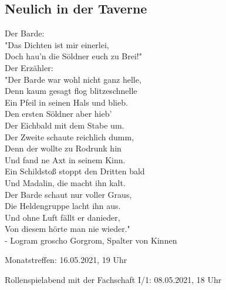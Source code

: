 \documentclass[final]{multiversum}
\begin{document}
\subsection{Neulich in der Taverne}
Der Barde:\\
"Das Dichten ist mir einerlei,\\
Doch hau'n die Söldner euch zu Brei!"\\[1em]
Der Erzähler:\\ 
"Der Barde war wohl nicht ganz helle,\\
Denn kaum gesagt flog blitzeschnelle\\
Ein Pfeil in seinen Hals und blieb.\\
Den ersten Söldner aber hieb'\\
Der Eichbald mit dem Stabe um. \\
Der Zweite schaute reichlich dumm,\\
Denn der wollte zu Rodrunk hin \\
Und fand ne Axt in seinem Kinn.\\
Ein Schildstoß stoppt den Dritten bald\\
Und Madalin, die macht ihn kalt.\\
Der Barde schaut nur voller Graus, \\
Die Heldengruppe lacht ihn aus.\\
Und ohne Luft fällt er danieder,\\
Von diesem hörte man nie wieder."\\[1em]
- Logram groscho Gorgrom, Spalter von Kinnen



\begin{termine}
\item Monatstreffen: 16.05.2021, 19 Uhr
\item Rollenspielabend mit der Fachschaft I/1: 08.05.2021, 18 Uhr
\end{termine}
\impressum
\end{document}
